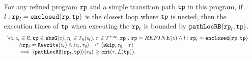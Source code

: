 \begin{lemma}
    For any refined program $\mathtt{rp}$ and a simple transition path $\mathtt{tp}$ in this program,
    if $l: \mathtt{rp}_l = \mathtt{enclosed}(\mathtt{rp}, \mathtt{tp})$ is the closest loop where $\mathtt{tp}$ is nested,
    then the execution times of $\mathtt{tp}$ when executing the $\mathtt{rp}_l$ is bounded by $\mathtt{pathLocRB}(\mathtt{rp}_l, \mathtt{tp})$.
    \[
      \begin{array}{l}
      \forall c, c_l \in \mathcal{C}, \mathtt{tp} \in \mathtt{abs}{\mathtt{G}}(c), \mathtt{\tau}_0 \in \mathcal{T}_0(c_l), \mathtt{\tau} \in \mathcal{T}^{+\infty}, \mathtt{rp} ~.~ 
      \mathtt{rp} = REFINE(c)
      \land
      l: \mathtt{rp}_l = \mathtt{enclosed}(\mathtt{rp}, \mathtt{tp})
      \\ \qquad
      \land 
      \mathtt{rp}_l = \mathtt{Rewrite}(c_l)
      \land
      \langle c_l, \mathtt{\tau}_0 \rangle \to^* 
      \langle \mathtt{skip}, \mathtt{\tau}_0 {\scriptscriptstyle ++} \mathtt{\tau} \rangle
      \\ \qquad
      \implies
      \langle \mathtt{pathLocRB}(\mathtt{rp}_l, \mathtt{tp}) \rangle(\mathtt{\tau}_0) \geq \mathtt{cnt}(\mathtt{\tau}, L(\mathtt{tp})).
      \end{array}
    \]  
\end{lemma}
